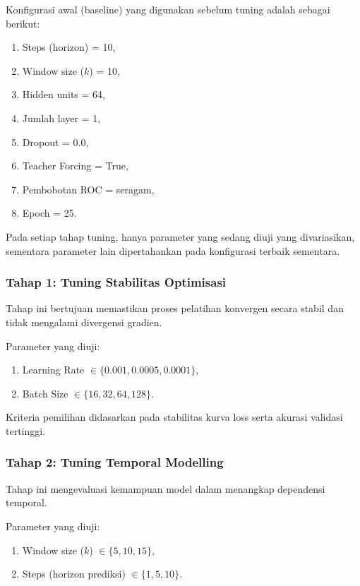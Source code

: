 Konfigurasi awal (baseline) yang digunakan sebelum tuning adalah sebagai berikut:

\begin{enumerate}
    \item Steps (horizon) = 10,
    \item Window size ($k$) = 10,
    \item Hidden units = 64,
    \item Jumlah layer = 1,
    \item Dropout = 0.0,
    \item Teacher Forcing = True,
    \item Pembobotan ROC = seragam,
    \item Epoch = 25.
\end{enumerate}

Pada setiap tahap tuning, hanya parameter yang sedang diuji yang divariasikan, sementara parameter lain dipertahankan pada konfigurasi terbaik sementara.

\subsubsection{Tahap 1: Tuning Stabilitas Optimisasi}

Tahap ini bertujuan memastikan proses pelatihan konvergen secara stabil dan tidak mengalami divergensi gradien.

Parameter yang diuji:

\begin{enumerate}
    \item Learning Rate $\in \{0.001, 0.0005, 0.0001\}$,
    \item Batch Size $\in \{16, 32, 64, 128\}$.
\end{enumerate}

Kriteria pemilihan didasarkan pada stabilitas kurva loss serta akurasi validasi tertinggi.

\subsubsection{Tahap 2: Tuning Temporal Modelling}

Tahap ini mengevaluasi kemampuan model dalam menangkap dependensi temporal.

Parameter yang diuji:

\begin{enumerate}
    \item Window size ($k$) $\in \{5, 10, 15\}$,
    \item Steps (horizon prediksi) $\in \{1, 5, 10\}$.
\end{enumerate}

